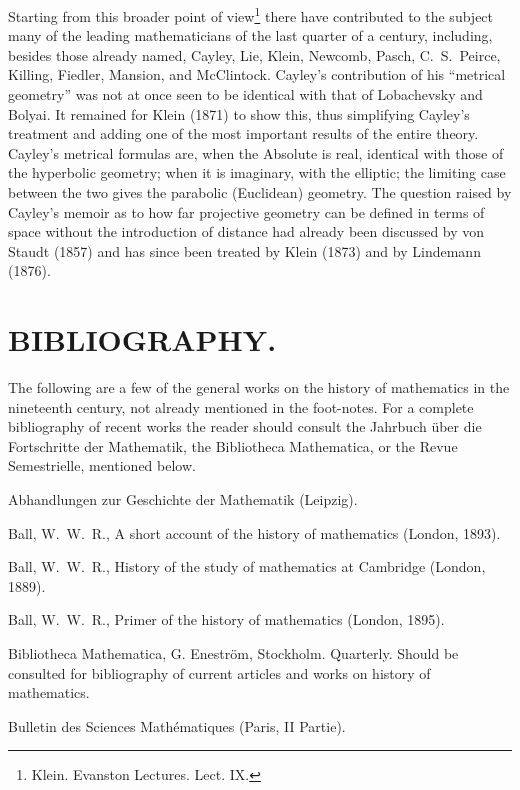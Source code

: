 \documentclass[oneside]{book}
\begin{document}
Starting from this broader point of view\footnote{Klein. Evanston
Lectures. Lect. IX.} there have contributed to the subject many of
the leading mathematicians of the last quarter of a century,
including, besides those already named, Cayley, Lie, Klein, Newcomb,
Pasch, C.~S.~Peirce, Killing, Fiedler, Mansion, and
McClintock. Cayley's contribution of his ``metrical geometry'' was
not at once seen to be identical with that of Lobachevsky and
Bolyai. It remained for Klein (1871) to show this, thus simplifying
Cayley's treatment and adding one of the most important results of
the entire theory. Cayley's metrical formulas are, when the Absolute
is real, identical with those of the hyperbolic geometry; when it
is imaginary, with the elliptic; the limiting case between the two
gives the parabolic (Euclidean) geometry. The question raised by
Cayley's memoir as to how far projective geometry can be defined in
terms of space without the introduction of distance had already been
discussed by von Staudt (1857) and has since been treated by Klein
(1873) and by Lindemann (1876).

\backmatter

\chapter{BIBLIOGRAPHY.}


The following are a few of the general works on the history of
mathematics in the nineteenth century, not already mentioned in the
foot-notes. For a complete bibliography of recent works the reader
should consult the Jahrbuch \"uber die Fortschritte der Mathematik,
the Bibliotheca Mathematica, or the Revue Semestrielle, mentioned
below.

\bigskip
Abhandlungen zur Geschichte der Mathematik (Leipzig).

Ball, W.~W.~R., A short account of the history of mathematics
(London, 1893).

Ball, W.~W.~R., History of the study of mathematics at Cambridge
(London, 1889).

Ball, W.~W.~R., Primer of the history of mathematics (London, 1895).

Bibliotheca Mathematica, G. Enestr\"om, Stockholm. Quarterly.
Should be consulted for bibliography of current articles and works
on history of mathematics.

Bulletin des Sciences Math\'ematiques (Paris, II Partie).
\end{document}
